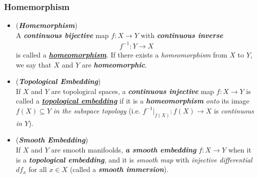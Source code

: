 \documentclass[11pt]{article}
\begin{document}
\subsubsection{Homemorphism}
\begin{itemize}
\item \begin{definition} (\textbf{\emph{Homemorphism}})\\
A \emph{\textbf{continuous bijective}} map $f: X \rightarrow Y$ with \emph{\textbf{continuous inverse}} 
\begin{align*}
f^{-1}: Y \rightarrow X
\end{align*}
is called a \underline{\emph{\textbf{homeomorphism}}}. If there exists a \emph{homeomorphism} from $X$ to $Y$, we say that $X$ and $Y$ are \emph{\textbf{homeomorphic}}.
\end{definition}


\item \begin{definition} (\emph{\textbf{Topological Embedding}})\\
If $X$ and $Y$ are topological spaces, a \emph{\textbf{continuous injective}} map $f: X \rightarrow Y$ is called a \underline{\emph{\textbf{topological embedding}}} if it is a \emph{\textbf{homeomorphism}} \emph{onto} its image $f(X) \subseteq Y$ \emph{in the subspace topology} (i.e. $f^{-1}|_{f(X)}: f(X) \rightarrow X$ is \emph{continuous in $Y$}).
\end{definition}

\item \begin{remark}(\emph{\textbf{Smooth Embedding}})\\
If $X$ and $Y$ are smooth manifoolds, \emph{\textbf{a smooth embedding}} $f: X \rightarrow Y$ when it is a \textbf{\emph{topological embedding}}, and it is \emph{smooth map} with \emph{injective differential} $df_{x}$ for all $x \in X$ (called a \emph{\textbf{smooth immersion}}).
\end{remark}
\end{itemize}
\end{document}

